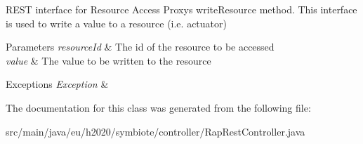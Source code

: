R\+E\+ST interface for Resource Access Proxy\textquotesingle{}s write\+Resource method. This interface is used to write a value to a resource (i.\+e. actuator)


\begin{DoxyParams}{Parameters}
{\em resource\+Id} & The id of the resource to be accessed \\
\hline
{\em value} & The value to be written to the resource \\
\hline
\end{DoxyParams}

\begin{DoxyExceptions}{Exceptions}
{\em Exception} & \\
\hline
\end{DoxyExceptions}


The documentation for this class was generated from the following file\+:\begin{DoxyCompactItemize}
\item 
src/main/java/eu/h2020/symbiote/controller/Rap\+Rest\+Controller.\+java\end{DoxyCompactItemize}
